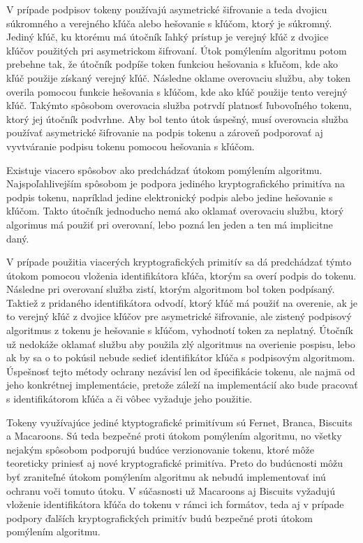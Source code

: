 V prípade podpisov tokeny používajú asymetrické šifrovanie a teda dvojicu súkromného a verejného kľúča alebo hešovanie s kľúčom, ktorý je súkromný. Jediný kľúč, ku ktorému má útočník ľahký prístup je verejný kľúč z dvojice kľúčov použitých pri asymetrickom šifrovaní. Útok pomýlením algoritmu potom prebehne tak, že útočník podpíše token funkciou hešovania s kľučom, kde ako kľúč použije získaný verejný kľúč. Následne oklame overovaciu službu, aby token overila pomocou funkcie hešovania s kľúčom, kde ako kľúč použije tento verejný kľúč. Takýmto spôsobom overovacia služba potrvdí platnosť ľubovoľného tokenu, ktorý jej útočník podvrhne. Aby bol tento útok úspešný, musí overovacia služba používať asymetrické šifrovanie na podpis tokenu a zároveň podporovať aj vyvtváranie podpisu tokenu pomocou hešovania s kľúčom.

Existuje viacero spôsobov ako predchádzať útokom pomýlením algoritmu. Najspoľahlivejším spôsobom je podpora jediného kryptografického primitíva na podpis tokenu, napríklad jedine elektronický podpis alebo jedine hešovanie s kľúčom. Takto útočník jednoducho nemá ako oklamať overovaciu službu, ktorý algorimus má použiť pri overovaní, lebo pozná len jeden a ten má implicitne daný. 

V prípade použitia viacerých kryptografických primitív sa dá predchádzať týmto útokom pomocou vloženia identifikátora kľúča, ktorým sa overí podpis do tokenu. Následne pri overovaní služba zistí, ktorým algoritmom bol token podpísaný. Taktiež z pridaného identifikátora odvodí, ktorý kľúč má použiť na overenie, ak je to verejný kľúč z dvojice kľúčov pre asymetrické šifrovanie, ale zistený podpisový algoritmus z tokenu je hešovanie s kľúčom, vyhodnotí token za neplatný. Útočník už nedokáže oklamať službu aby použila zlý algoritmus na overienie pospisu, lebo ak by sa o to pokúsil nebude sedieť identifikátor kľúča s podpisovým algoritmom. Úspešnosť tejto métody ochrany nezávisí len od špecifikácie tokenu, ale najmä od jeho konkrétnej implementácie, pretože záleží na implementácií ako bude pracovať s identifikátorom kľúča a či vôbec vyžaduje jeho použitie.

Tokeny využívajúce jediné ktyptografické primitívum sú Fernet, Branca, Biscuits a Macaroons. Sú teda bezpečné proti útokom pomýlením algoritmu, no všetky nejakým spôsobom podporujú budúce verzionovanie tokenu, ktoré môže teoreticky priniesť aj nové kryptografické primitíva. Preto do budúcnosti môžu byť zraniteľné útokom pomýlením algoritmu ak nebudú implementovať inú ochranu voči tomuto útoku. V súčasnosti už Macaroons aj Biscuits vyžadujú vloženie identifikátora kľúča do tokenu v rámci ich formátov, teda aj v prípade podpory ďalších kryptografických primitív budú bezpečné proti útokom pomýlením algoritmu.

